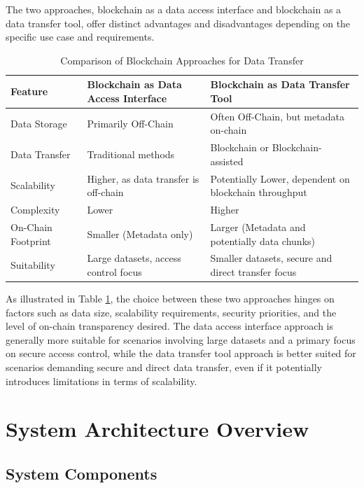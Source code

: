 \documentclass[10pt]{llncs}
\begin{document}
The two approaches, blockchain as a data access interface and blockchain as a data transfer tool, offer distinct advantages and disadvantages depending on the specific use case and requirements.

\begin{table}[h!]
\caption{Comparison of Blockchain Approaches for Data Transfer}
\label{tab:comparison}
\begin{tabular}{|p{2.0cm}|p{5.0cm}|p{5.0cm}|}
\hline
Feature & Blockchain as Data Access Interface & Blockchain as Data Transfer Tool \\ \hline
Data Storage & Primarily Off-Chain & Often Off-Chain, but metadata on-chain \\ \hline
Data Transfer & Traditional methods & Blockchain or Blockchain-assisted \\ \hline
Scalability & Higher, as data transfer is off-chain & Potentially Lower, dependent on blockchain throughput \\ \hline
Complexity & Lower & Higher \\ \hline
On-Chain Footprint & Smaller (Metadata only) & Larger (Metadata and potentially data chunks) \\ \hline
Suitability & Large datasets, access control focus & Smaller datasets, secure and direct transfer focus \\ \hline
\end{tabular}

\end{table}

As illustrated in Table \ref{tab:comparison}, the choice between these two approaches hinges on factors such as data size, scalability requirements, security priorities, 
and the level of on-chain transparency desired. 
The data access interface approach is generally more suitable for scenarios involving large datasets and a primary focus on secure access control, while the data transfer tool 
approach is better suited for scenarios demanding secure and direct data transfer, even if it potentially introduces limitations in terms of scalability.

\section{System Architecture Overview} \label{architecture}

\subsection{System Components}
\end{document}
